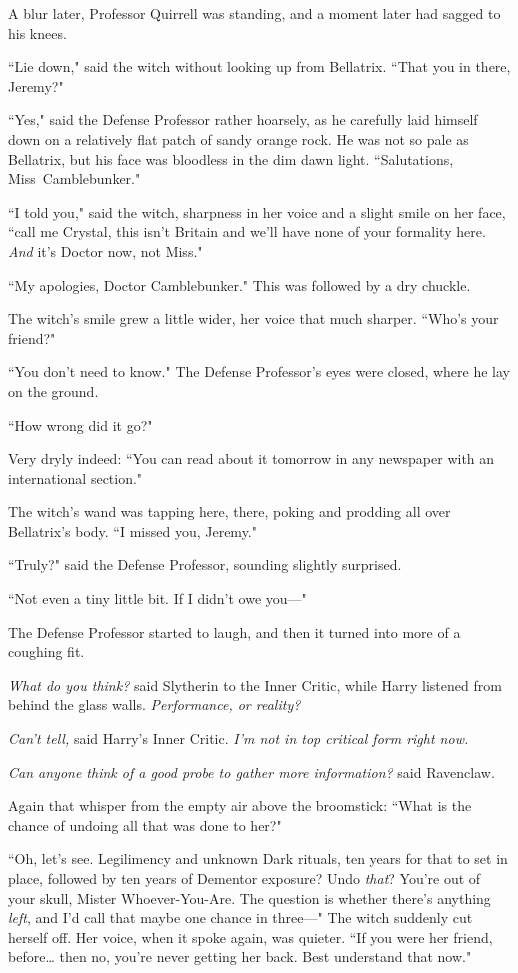 A blur later, Professor Quirrell was standing, and a moment later had sagged to his knees.

``Lie down," said the witch without looking up from Bellatrix. ``That you in there, Jeremy?"

``Yes," said the Defense Professor rather hoarsely, as he carefully laid himself down on a relatively flat patch of sandy orange rock. He was not so pale as Bellatrix, but his face was bloodless in the dim dawn light. ``Salutations, Miss~Camblebunker."

``I told you," said the witch, sharpness in her voice and a slight smile on her face, ``call me Crystal, this isn't Britain and we'll have none of your formality here. \emph{And} it's Doctor now, not Miss."

``My apologies, Doctor Camblebunker." This was followed by a dry chuckle.

The witch's smile grew a little wider, her voice that much sharper. ``Who's your friend?"

``You don't need to know." The Defense Professor's eyes were closed, where he lay on the ground.

``How wrong did it go?"

Very dryly indeed: ``You can read about it tomorrow in any newspaper with an international section."

The witch's wand was tapping here, there, poking and prodding all over Bellatrix's body. ``I missed you, Jeremy."

``Truly?" said the Defense Professor, sounding slightly surprised.

``Not even a tiny little bit. If I didn't owe you---"

The Defense Professor started to laugh, and then it turned into more of a coughing fit.

\emph{What do you think?} said Slytherin to the Inner Critic, while Harry listened from behind the glass walls. \emph{Performance, or reality?}

\emph{Can't tell,} said Harry's Inner Critic. \emph{I'm not in top critical form right now.}

\emph{Can anyone think of a good probe to gather more information?} said Ravenclaw.

Again that whisper from the empty air above the broomstick: ``What is the chance of undoing all that was done to her?"

``Oh, let's see. Legilimency and unknown Dark rituals, ten years for that to set in place, followed by ten years of Dementor exposure? Undo \emph{that}? You're out of your skull, Mister Whoever-You-Are. The question is whether there's anything \emph{left}, and I'd call that maybe one chance in three---" The witch suddenly cut herself off. Her voice, when it spoke again, was quieter. ``If you were her friend, before{\ldots} then no, you're never getting her back. Best understand that now."

